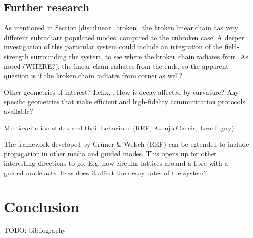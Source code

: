 \documentclass{article}
\begin{document}
\subsection{Further research}\label{sec:further}

As mentioned in Section \ref{disc:linear_broken}, the broken linear chain has very different subradiant populated modes, compared to the unbroken case. A deeper investigation of this particular system could include an integration of the field-strength surrounding the system, to see where the broken chain radiates from. As noted (WHERE?), the linear chain radiates from the ends, so the apparent question is if the broken chain radiates from corner as well? 

Other geometries of interest? Helix, . How is decay affected by curvature?
Any specific geometries that make efficient and high-fidelity communication protocols available?

Multiexcitation states and their behaviour (REF, Asenjo-Garcia, Israeli guy)

The framework developed by Grüner \& Welsch (REF) can be extended to include propagation in other media and guided modes. This opens up for other interesting directions to go. E.g. how circular lattices around a fibre with a guided mode acts. How does it affect the decay rates of the system? 

\section{Conclusion}

\newpage
TODO: bibliography
\end{document}
